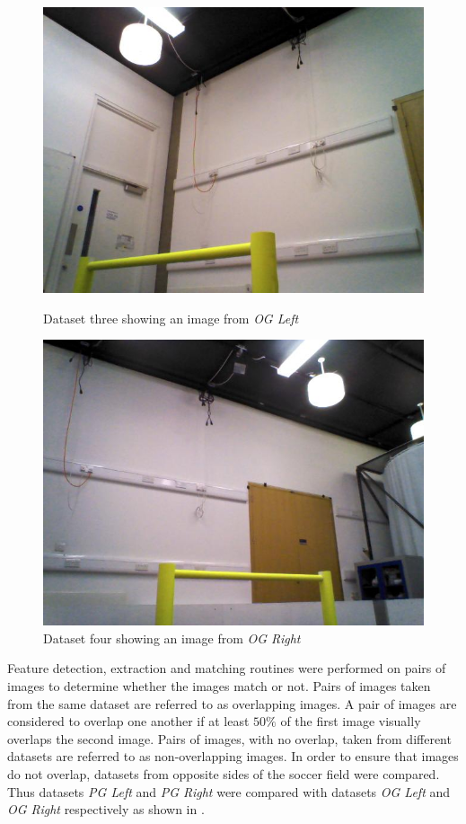 \documentclass{report}
\begin{document}
\begin{figure}[h!]
\begin{minipage}[b]{0.5\linewidth}
\includegraphics[scale=0.5]{../Drawings/datasetImages/ogLeft.jpg}
\caption{Dataset three showing an image from \textit{OG Left}}
\label{fig:dataset3}
\end{minipage}
\hspace{0.5cm}
\begin{minipage}[b]{0.5\linewidth}
\includegraphics[scale=0.5]{../Drawings/datasetImages/ogRight.jpg}
\caption{Dataset four showing an image from \textit{OG Right}}
\label{fig:dataset4}
\end{minipage}
\end{figure}

Feature detection, extraction and matching routines were performed on pairs of images to determine whether the images match or not. Pairs of images taken from the same dataset are referred to as overlapping images. A pair of images are considered to overlap one another if at least $50\%$ of the first image visually overlaps the second image. Pairs of images, with no overlap, taken from different datasets are referred to as non-overlapping images. In order to ensure that images do not overlap, datasets from opposite sides of the soccer field were compared. Thus datasets \textit{PG Left} and \textit{PG Right} were compared with datasets \textit{OG Left} and \textit{OG Right} respectively as shown in . \\
\end{document}
